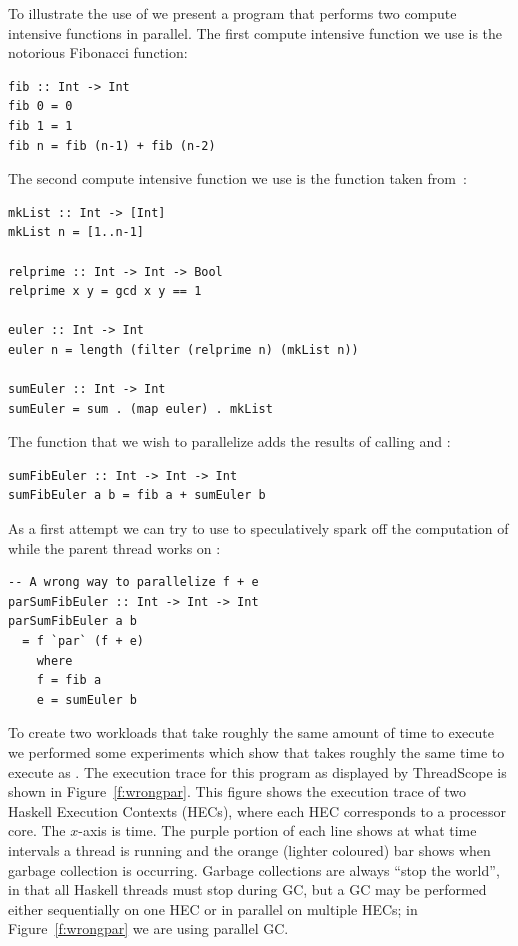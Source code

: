 To illustrate the use of  we present a program that performs two compute intensive functions in parallel. The first compute intensive function we use is the notorious Fibonacci function:
\begin{lstlisting}
fib :: Int -> Int
fib 0 = 0
fib 1 = 1
fib n = fib (n-1) + fib (n-2)
\end{lstlisting}
The second compute intensive function we use is the  function taken from~\cite{trinder:02}:
\begin{lstlisting}
mkList :: Int -> [Int]
mkList n = [1..n-1]

relprime :: Int -> Int -> Bool
relprime x y = gcd x y == 1

euler :: Int -> Int
euler n = length (filter (relprime n) (mkList n))

sumEuler :: Int -> Int
sumEuler = sum . (map euler) . mkList
\end{lstlisting}
The function that we wish to parallelize adds the results of calling  and :
\begin{lstlisting}
sumFibEuler :: Int -> Int -> Int
sumFibEuler a b = fib a + sumEuler b
\end{lstlisting}
As a first attempt we can try to use  to speculatively spark off the computation of  while the parent thread works on :
\begin{lstlisting}
-- A wrong way to parallelize f + e
parSumFibEuler :: Int -> Int -> Int
parSumFibEuler a b
  = f `par` (f + e)
    where
    f = fib a
    e = sumEuler b
\end{lstlisting}

To create two workloads that take roughly the same amount of time to
execute we performed some experiments which show that 
takes roughly the same time to execute as .  The
execution trace for this program as displayed by ThreadScope is shown
in Figure~\ref{f:wrongpar}. This figure shows the execution trace of
two Haskell Execution Contexts (HECs), where each HEC corresponds to a
processor core.  The $x$-axis is time.  The purple portion of each
line shows at what time intervals a thread is running and the orange
(lighter coloured) bar shows when garbage collection is occurring.
Garbage collections are always ``stop the world'', in that all Haskell
threads must stop during GC, but a GC may be performed either
sequentially on one HEC or in parallel on multiple HECs; in
Figure~\ref{f:wrongpar} we are using parallel GC.

